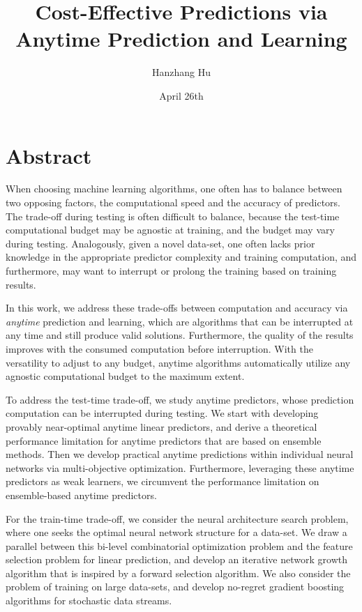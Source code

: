 \documentclass[review,12pt]{cmuthesis}
\title{
{Cost-Effective Predictions via\\ Anytime Prediction and Learning}\\
}
\author{
Hanzhang Hu}
\date{April 26th}
\begin{document}
\maketitle


\chapter*{Abstract}
When choosing machine learning algorithms, one often has to balance between two opposing factors, 
the computational speed and the accuracy of predictors. 
The trade-off during testing is often difficult to balance, 
because the test-time computational budget may be agnostic
at training, and the budget may vary during testing. 
Analogously, given a novel data-set, one often lacks prior knowledge in the appropriate predictor complexity
and training computation, and furthermore, may want to interrupt or prolong the training 
based on training results. 

In this work, we address these trade-offs between computation and accuracy via \emph{anytime} prediction and 
learning, which are algorithms that can be interrupted at any time and still produce valid solutions. 
Furthermore, the quality of the results improves with the consumed computation before interruption. 
With the versatility to adjust to any budget, anytime algorithms automatically
 utilize any agnostic computational budget to the maximum extent.

To address the test-time trade-off, we study anytime predictors, whose prediction computation can be interrupted during testing. 
We start with developing provably near-optimal anytime linear predictors, and derive a theoretical performance limitation
for anytime predictors that are based on ensemble methods. Then we develop practical 
anytime predictions within individual neural networks via multi-objective optimization. 
Furthermore, leveraging these anytime predictors as weak learners, we circumvent the
performance limitation on ensemble-based anytime predictors.

For the train-time trade-off, we consider the neural architecture search problem, where
one seeks the optimal neural network structure for a data-set. We draw a parallel between this bi-level 
combinatorial optimization problem and the feature selection problem for linear prediction, 
and develop an iterative network growth algorithm that is inspired by a forward selection algorithm. 
We also consider the problem of training on large data-sets, and develop 
no-regret gradient boosting algorithms for stochastic data streams.
\end{document}

